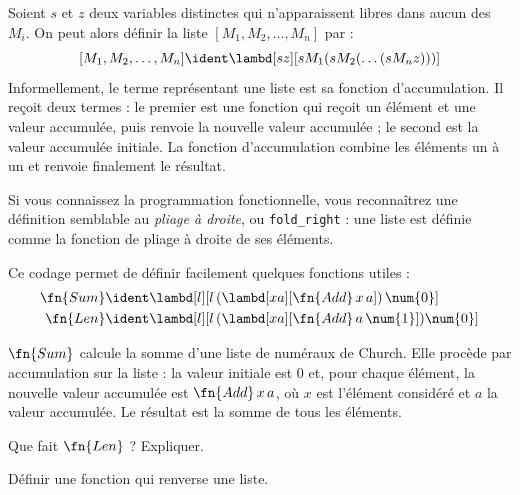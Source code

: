 \documentclass[../../../include/open-logic-section]{subfiles}
\begin{document}

Soient $s$ et $z$ deux variables distinctes qui n'apparaissent libres dans aucun des $M_i$. On peut alors définir la liste $[M_1,M_2,\ldots,M_n]$ par :
\[
  [M_1, M_2, \ldots, M_n] \ident \lambd[sz][s M_1 (s M_2 (\ldots (s M_n z)))]
\]
Informellement, le terme représentant une liste est sa
fonction d'accumulation. Il reçoit deux termes : le premier
est une fonction qui reçoit un élément et une valeur
accumulée, puis renvoie la nouvelle valeur accumulée ;
le second est la valeur accumulée initiale. La fonction
d'accumulation combine les éléments un à un et renvoie
finalement le résultat.

\begin{digress}
Si vous connaissez la programmation fonctionnelle, vous
reconnaîtrez une définition semblable au \emph{pliage à
droite}, ou \texttt{fold\_right} : une liste est définie
comme la fonction de pliage à droite de ses éléments.
\end{digress}

Ce codage permet de définir facilement quelques fonctions
utiles :
\begin{align*}
  \fn{Sum} & \ident
  \lambd[l][l \, (\lambd[xa][\fn{Add} \, x \, a])\,  \num{0}]\\
  \fn{Len} & \ident
  \lambd[l][l \, (\lambd[xa][\fn{Add} \, a \, \num{1}]) \num{0}]
\end{align*}

$\fn{Sum}$ calcule la somme d'une liste de numéraux de Church.
Elle procède par accumulation sur la liste : la valeur
initiale est $\num{0}$ et, pour chaque élément, la nouvelle
valeur accumulée est $\fn{Add}\,x\,a$, où $x$ est l'élément
considéré et $a$ la valeur accumulée. Le résultat est la
somme de tous les éléments.

\begin{prob}
Que fait $\fn{Len}$ ? Expliquer.
\end{prob}

\begin{prob}
Définir une fonction qui renverse une liste.
\end{prob}
\end{document}

